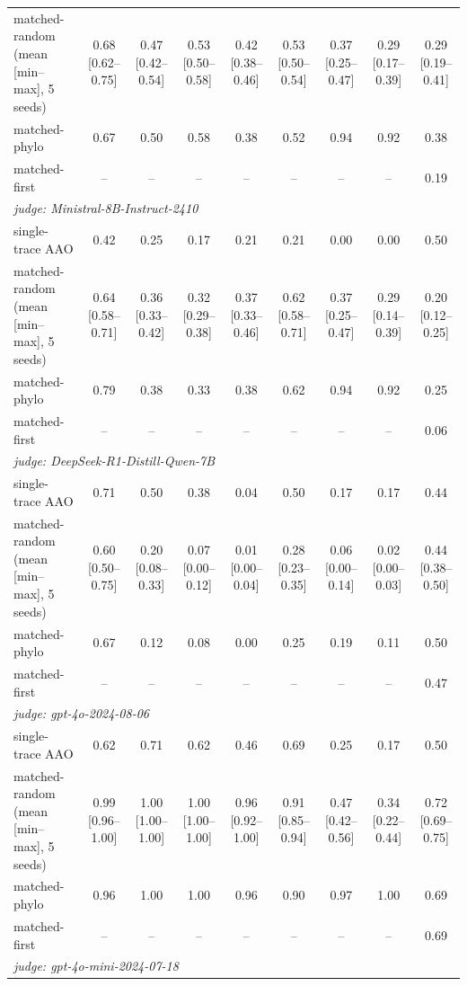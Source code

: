 \begin{table}[t]
\begin{tabular}{lcccccccc}
matched-random (mean [min--max], 5 seeds) & 0.68 [0.62--0.75] & 0.47 [0.42--0.54] & 0.53 [0.50--0.58] & 0.42 [0.38--0.46] & 0.53 [0.50--0.54] & 0.37 [0.25--0.47] & 0.29 [0.17--0.39] & 0.29 [0.19--0.41] \\
matched-phylo & 0.67 & 0.50 & 0.58 & 0.38 & 0.52 & 0.94 & 0.92 & 0.38 \\
matched-first & -- & -- & -- & -- & -- & -- & -- & 0.19 \\
\midrule
\multicolumn{9}{l}{\emph{judge: Ministral-8B-Instruct-2410}} \\
single-trace AAO & 0.42 & 0.25 & 0.17 & 0.21 & 0.21 & 0.00 & 0.00 & 0.50 \\
matched-random (mean [min--max], 5 seeds) & 0.64 [0.58--0.71] & 0.36 [0.33--0.42] & 0.32 [0.29--0.38] & 0.37 [0.33--0.46] & 0.62 [0.58--0.71] & 0.37 [0.25--0.47] & 0.29 [0.14--0.39] & 0.20 [0.12--0.25] \\
matched-phylo & 0.79 & 0.38 & 0.33 & 0.38 & 0.62 & 0.94 & 0.92 & 0.25 \\
matched-first & -- & -- & -- & -- & -- & -- & -- & 0.06 \\
\midrule
\multicolumn{9}{l}{\emph{judge: DeepSeek-R1-Distill-Qwen-7B}} \\
single-trace AAO & 0.71 & 0.50 & 0.38 & 0.04 & 0.50 & 0.17 & 0.17 & 0.44 \\
matched-random (mean [min--max], 5 seeds) & 0.60 [0.50--0.75] & 0.20 [0.08--0.33] & 0.07 [0.00--0.12] & 0.01 [0.00--0.04] & 0.28 [0.23--0.35] & 0.06 [0.00--0.14] & 0.02 [0.00--0.03] & 0.44 [0.38--0.50] \\
matched-phylo & 0.67 & 0.12 & 0.08 & 0.00 & 0.25 & 0.19 & 0.11 & 0.50 \\
matched-first & -- & -- & -- & -- & -- & -- & -- & 0.47 \\
\midrule
\multicolumn{9}{l}{\emph{judge: gpt-4o-2024-08-06}} \\
single-trace AAO & 0.62 & 0.71 & 0.62 & 0.46 & 0.69 & 0.25 & 0.17 & 0.50 \\
matched-random (mean [min--max], 5 seeds) & 0.99 [0.96--1.00] & 1.00 [1.00--1.00] & 1.00 [1.00--1.00] & 0.96 [0.92--1.00] & 0.91 [0.85--0.94] & 0.47 [0.42--0.56] & 0.34 [0.22--0.44] & 0.72 [0.69--0.75] \\
matched-phylo & 0.96 & 1.00 & 1.00 & 0.96 & 0.90 & 0.97 & 1.00 & 0.69 \\
matched-first & -- & -- & -- & -- & -- & -- & -- & 0.69 \\
\midrule
\multicolumn{9}{l}{\emph{judge: gpt-4o-mini-2024-07-18}} \\

\end{tabular}
\end{table}
